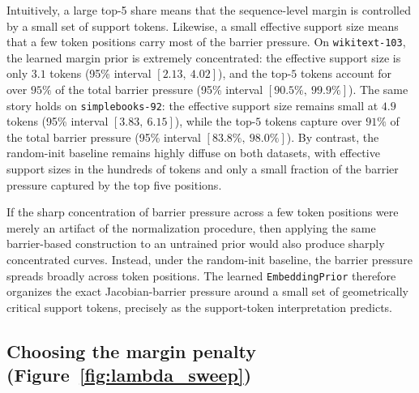 \documentclass[11pt]{article}
\begin{document}
Intuitively, a large top-5 share means that the sequence-level margin is
controlled by a small set of support tokens. Likewise, a small effective support size
means that a few token positions carry most of the barrier pressure. On
\texttt{wikitext-103}, the learned margin prior is extremely concentrated: the
effective support size is only $3.1$ tokens (95\% interval $[2.13,~4.02]$), and the top-$5$ tokens account for over $95\%$ of the total
barrier pressure (95\% interval $[90.5\%,~99.9\%]$). The same story holds on \texttt{simplebooks-92}: the effective
support size remains small at $4.9$ tokens (95\% interval $[3.83,~6.15]$), while
the top-$5$ tokens capture over $91\%$ of the total barrier pressure (95\% interval $[83.8\%,~98.0\%]$). By
contrast, the random-init baseline remains highly diffuse on both datasets,
with effective support sizes in the hundreds of tokens and only a small
fraction of the barrier pressure captured by the top five positions.

If the sharp concentration of barrier pressure across a few token positions
were merely an artifact of the normalization procedure, then applying the same
barrier-based construction to an untrained prior would also produce sharply
concentrated curves. Instead, under the random-init baseline, the barrier
pressure spreads broadly across token positions. The learned
\texttt{EmbeddingPrior} therefore organizes the exact Jacobian-barrier
pressure around a small set of geometrically critical support tokens,
precisely as the support-token interpretation predicts.

\subsection{Choosing the margin penalty (Figure~\ref{fig:lambda_sweep})}
\label{sec:exp_lambda}
\end{document}
